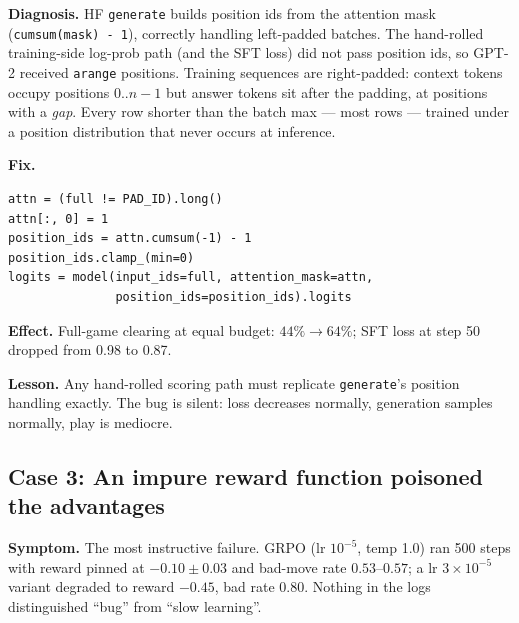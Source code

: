 \documentclass[11pt]{article}
\begin{document}
\textbf{Diagnosis.} HF \texttt{generate} builds position ids from the
attention mask (\texttt{cumsum(mask) - 1}), correctly handling left-padded
batches. The hand-rolled training-side log-prob path (and the SFT loss) did
not pass position ids, so GPT-2 received \texttt{arange} positions. Training
sequences are right-padded: context tokens occupy positions $0..n-1$ but
answer tokens sit after the padding, at positions with a \emph{gap}. Every
row shorter than the batch max --- most rows --- trained under a position
distribution that never occurs at inference.

\textbf{Fix.}
\begin{lstlisting}[caption={Position ids for padded rows, matching generate().}]
attn = (full != PAD_ID).long()
attn[:, 0] = 1
position_ids = attn.cumsum(-1) - 1
position_ids.clamp_(min=0)
logits = model(input_ids=full, attention_mask=attn,
               position_ids=position_ids).logits
\end{lstlisting}
\textbf{Effect.} Full-game clearing at equal budget: $44\% \to 64\%$; SFT
loss at step 50 dropped from 0.98 to 0.87.

\textbf{Lesson.} Any hand-rolled scoring path must replicate
\texttt{generate}'s position handling exactly. The bug is silent: loss
decreases normally, generation samples normally, play is mediocre.

\subsection{Case 3: An impure reward function poisoned the advantages}
\label{sec:bug-reward}
\textbf{Symptom.} The most instructive failure. GRPO (lr $10^{-5}$, temp 1.0)
ran 500 steps with reward pinned at $-0.10 \pm 0.03$ and bad-move rate
$0.53$--$0.57$; a lr $3{\times}10^{-5}$ variant degraded to reward $-0.45$,
bad rate $0.80$. Nothing in the logs distinguished ``bug'' from ``slow
learning''.
\end{document}
